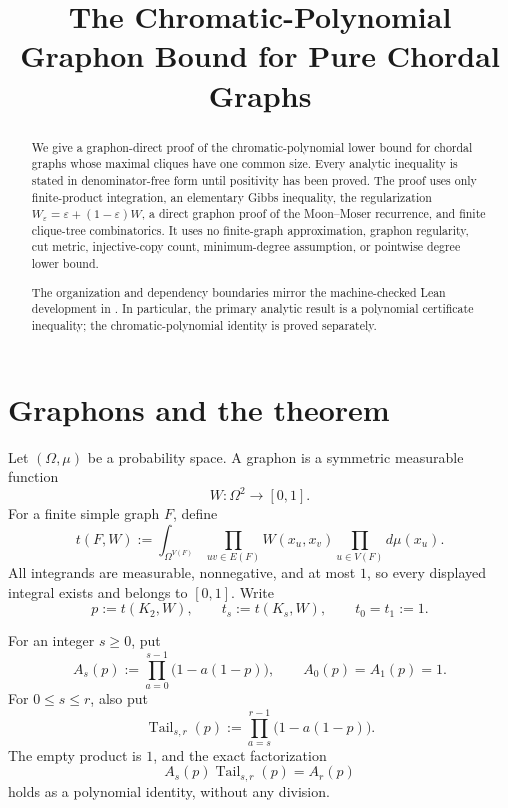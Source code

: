 \documentclass[11pt]{article}
\title{The Chromatic-Polynomial Graphon Bound for Pure Chordal Graphs}
\author{}
\date{}
\newcommand{\Tail}{\operatorname{Tail}}
\begin{document}
\maketitle

\begin{abstract}
We give a graphon-direct proof of the chromatic-polynomial lower bound for
chordal graphs whose maximal cliques have one common size.  Every analytic
inequality is stated in denominator-free form until positivity has been
proved.  The proof uses only finite-product integration, an elementary Gibbs
inequality, the regularization
\(W_\varepsilon=\varepsilon+(1-\varepsilon)W\), a direct graphon proof of the
Moon--Moser recurrence, and finite clique-tree combinatorics.  It uses no
finite-graph approximation, graphon regularity, cut metric, injective-copy
count, minimum-degree assumption, or pointwise degree lower bound.

The organization and dependency boundaries mirror the machine-checked Lean
development in .  In particular, the
primary analytic result is a polynomial certificate inequality; the
chromatic-polynomial identity is proved separately.
\end{abstract}

\section{Graphons and the theorem}

Let \((\Omega,\mu)\) be a probability space.  A graphon is a symmetric
measurable function
\[
    W\colon\Omega^2\longrightarrow[0,1].
\]
For a finite simple graph \(F\), define
\[
    t(F,W)
    :=
    \int_{\Omega^{V(F)}}
       \prod_{uv\in E(F)}W(x_u,x_v)
       \prod_{u\in V(F)}d\mu(x_u).
\]
All integrands are measurable, nonnegative, and at most \(1\), so every
displayed integral exists and belongs to \([0,1]\).  Write
\[
    p:=t(K_2,W),
    \qquad
    t_s:=t(K_s,W),
    \qquad
    t_0=t_1:=1.
\]

For an integer \(s\ge0\), put
\[
    A_s(p)
    :=
    \prod_{a=0}^{s-1}\bigl(1-a(1-p)\bigr),
    \qquad A_0(p)=A_1(p)=1.
\]
For \(0\le s\le r\), also put
\[
    \Tail_{s,r}(p)
    :=
    \prod_{a=s}^{r-1}\bigl(1-a(1-p)\bigr).
\]
The empty product is \(1\), and the exact factorization
\begin{equation}\label{eq:A-tail}
    A_s(p)\Tail_{s,r}(p)=A_r(p)
\end{equation}
holds as a polynomial identity, without any division.
\end{document}
